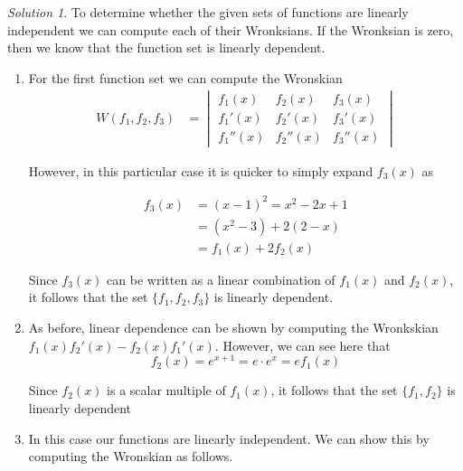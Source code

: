 \documentclass[12pt,a4paper]{article}
\theoremstyle{definition}
\theoremstyle{remark}
\newtheorem*{solution}{Solution}
\begin{document}
\begin{solution}
    To determine whether the given sets of functions are linearly independent we can compute each of their Wronksians. If the Wronksian is zero, then we know that the function set is linearly dependent.

    \begin{enumerate}
        \item For the first function set we can compute the Wronskian 
        \begin{align*}
            W(f_1, f_2, f_3) &= \begin{vmatrix}
                f_1(x) & f_2(x) & f_3(x) \\
                f_1'(x) & f_2'(x) & f_3'(x) \\
                f_1''(x) & f_2''(x) & f_3''(x) 
            \end{vmatrix}
        \end{align*}

        However, in this particular case it is quicker to simply expand $f_3(x)$ as 

        \begin{align*}
            f_3(x) &= (x-1)^2 = x^2 -2x +1 \\
            &= (x^2-3) + 2(2-x) \\
            &= f_1(x) +2f_2(x)
        \end{align*}

        Since $f_3(x)$ can be written as a linear combination of $f_1(x)$ and $f_2(x)$, it follows that the set $\{f_1, f_2, f_3\}$ is linearly dependent. 

        \item As before, linear dependence can be shown by computing the Wronkskian $f_1(x) f_2'(x) - f_2(x) f_1'(x)$. However, we can see here that 
        $$f_2(x) = e^{x+1} = e \cdot e^x = e f_1(x)$$

        Since $f_2(x)$ is a scalar multiple of $f_1(x)$, it follows that the set $\{f_1, f_2\}$ is linearly dependent

        \item In this case our functions are linearly independent. We can show this by computing the Wronskian as follows.


\end{enumerate}
\end{solution}
\end{document}
